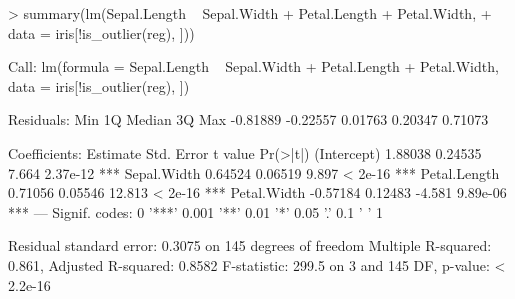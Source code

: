 \documentclass[a4paper,oneside,11pt,DIV=12]{scrartcl}
\begin{document}
\begin{Schunk}
\begin{Sinput}
> summary(lm(Sepal.Length ~ Sepal.Width + Petal.Length + Petal.Width,
+         data = iris[!is_outlier(reg), ]))
\end{Sinput}
\begin{Soutput}
Call:
lm(formula = Sepal.Length ~ Sepal.Width + Petal.Length + Petal.Width, 
    data = iris[!is_outlier(reg), ])

Residuals:
     Min       1Q   Median       3Q      Max 
-0.81889 -0.22557  0.01763  0.20347  0.71073 

Coefficients:
             Estimate Std. Error t value Pr(>|t|)    
(Intercept)   1.88038    0.24535   7.664 2.37e-12 ***
Sepal.Width   0.64524    0.06519   9.897  < 2e-16 ***
Petal.Length  0.71056    0.05546  12.813  < 2e-16 ***
Petal.Width  -0.57184    0.12483  -4.581 9.89e-06 ***
---
Signif. codes:  0 '***' 0.001 '**' 0.01 '*' 0.05 '.' 0.1 ' ' 1

Residual standard error: 0.3075 on 145 degrees of freedom
Multiple R-squared:  0.861,	Adjusted R-squared:  0.8582 
F-statistic: 299.5 on 3 and 145 DF,  p-value: < 2.2e-16
\end{Soutput}
\end{Schunk}
\end{document}
